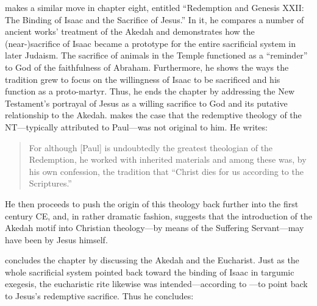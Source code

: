 \vermes makes a similar move in chapter eight, entitled ``Redemption and Genesis XXII: The Binding of Isaac and the Sacrifice of Jesus.'' In it, he compares a number of ancient works' treatment of the Akedah and demonstrates how the (near-)sacrifice of Isaac became a prototype for the entire sacrificial system in later Judaism. The sacrifice of animals in the Temple functioned as a ``reminder'' to God of the faithfulness of Abraham. Furthermore, he shows the ways the tradition grew to focus on the willingness of Isaac to be sacrificed and his function as a proto-martyr. Thus, he ends the chapter by addressing the New Testament's portrayal of Jesus as a willing sacrifice to God and its putative relationship to the Akedah. \vermes makes the case that the redemptive theology of the NT---typically attributed to Paul---was not original to him. He writes: 

\begin{quote}
    For although [Paul] is undoubtedly the greatest theologian of the Redemption, he worked with inherited materials and among these was, by his own confession, the tradition that ``Christ dies for us according to the Scriptures.''%
    \autocite[221]{vermes1961}
\end{quote}

\noindent
He then proceeds to push the origin of this theology back further into the first century CE, and, in rather dramatic fashion, suggests that the introduction of the Akedah motif into Christian theology---by means of the Suffering Servant---may have been by Jesus himself.%
    \autocite[223]{vermes1961}

\vermes concludes the chapter by discussing the Akedah and the Eucharist. Just as the whole sacrificial system pointed back toward the binding of Isaac in targumic exegesis, the eucharistic rite likewise was intended---according to \vermes---to point back to Jesus's redemptive sacrifice. Thus he concludes: 

